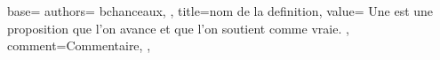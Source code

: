 {
  base={
    authors={
      bchanceaux,
    },
    title=nom de la definition,
    value={
      Une  est une proposition que l'on avance et que l'on soutient comme vraie.
    },
    comment={Commentaire},
  },
}
